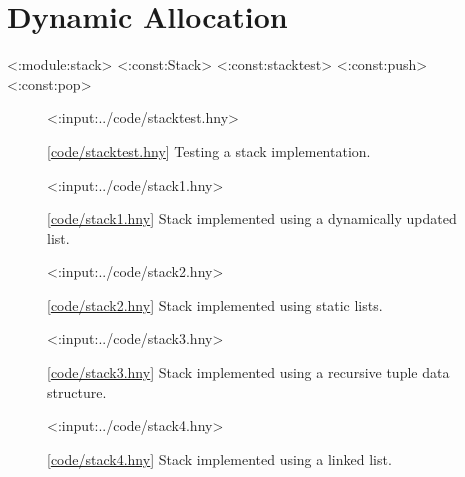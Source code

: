 \documentclass{report}
\newcommand{\harmonylink}[1]{%
[\href{https://harmony.cs.cornell.edu/#1}{\underline{#1}}]%
}
\newenvironment{code}{
\tcolorbox
}{
\endtcolorbox
}
\begin{document}
\section{Dynamic Allocation}

<{:module:stack}>
<{:const:Stack}>
<{:const:stacktest}>
<{:const:push}>
<{:const:pop}>

\begin{figure}
\begin{code}
<{:input:../code/stacktest.hny}>
\end{code}
\caption{\harmonylink{code/stacktest.hny} Testing a stack implementation.}
\label{fig:stacktest}
\end{figure}

\begin{figure}
\begin{code}
<{:input:../code/stack1.hny}>
\end{code}
\caption{\harmonylink{code/stack1.hny} Stack implemented using a dynamically updated list.}
\label{fig:stack1}
\end{figure}

\begin{figure}
\begin{code}
<{:input:../code/stack2.hny}>
\end{code}
\caption{\harmonylink{code/stack2.hny} Stack implemented using static lists.}
\label{fig:stack2}
\end{figure}

\begin{figure}
\begin{code}
<{:input:../code/stack3.hny}>
\end{code}
\caption{\harmonylink{code/stack3.hny} Stack implemented using a recursive tuple data structure.}
\label{fig:stack3}
\end{figure}

\begin{figure}
\begin{code}
<{:input:../code/stack4.hny}>
\end{code}
\caption{\harmonylink{code/stack4.hny} Stack implemented using a linked list.}
\label{fig:stack4}
\end{figure}
\end{document}
